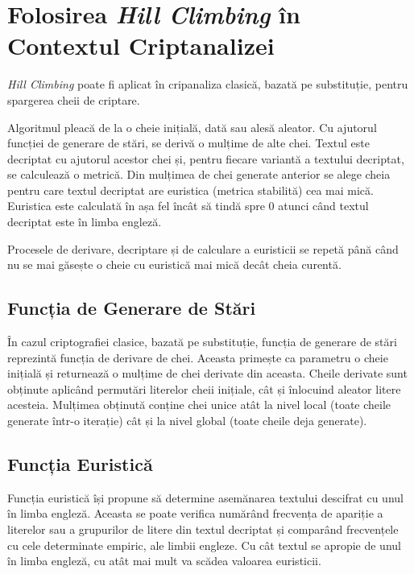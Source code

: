 \documentclass{article}
\begin{document}
\newpage

\section{Folosirea \textit{Hill Climbing} în Contextul Criptanalizei}

\textit{Hill Climbing} poate fi aplicat în cripanaliza clasică, bazată pe substituție, pentru spargerea cheii de criptare. 

Algoritmul pleacă de la o cheie inițială, dată sau alesă aleator. Cu ajutorul funcției de generare de stări, se derivă o mulțime de alte chei. Textul este decriptat cu ajutorul acestor chei și, pentru fiecare variantă a textului decriptat, se calculează o metrică. Din mulțimea de chei generate anterior se alege cheia pentru care textul decriptat are euristica (metrica stabilită) cea mai mică. Euristica este calculată în așa fel încât să tindă spre 0 atunci când textul decriptat este în limba engleză.

Procesele de derivare, decriptare și de calculare a euristicii se repetă până când nu se mai găsește o cheie cu euristică mai mică decât cheia curentă.

\subsection{Funcția de Generare de Stări}

În cazul criptografiei clasice, bazată pe substituție, funcția de generare de stări reprezintă funcția de derivare de chei. Aceasta primește ca parametru o cheie inițială și returnează o mulțime de chei derivate din aceasta. Cheile derivate sunt obținute aplicând permutări literelor cheii inițiale, cât și înlocuind aleator litere acesteia. Mulțimea obținută conține chei unice atât la nivel local (toate cheile generate într-o iterație) cât și la nivel global (toate cheile deja generate).

\subsection{Funcția Euristică}

Funcția euristică își propune să determine asemănarea textului descifrat cu unul în limba engleză. Aceasta se poate verifica numărând frecvența de apariție a literelor sau a grupurilor de litere din textul decriptat și comparând frecvențele cu cele determinate empiric, ale limbii engleze. Cu cât textul se apropie de unul în limba engleză, cu atât mai mult va scădea valoarea euristicii.
\end{document}
